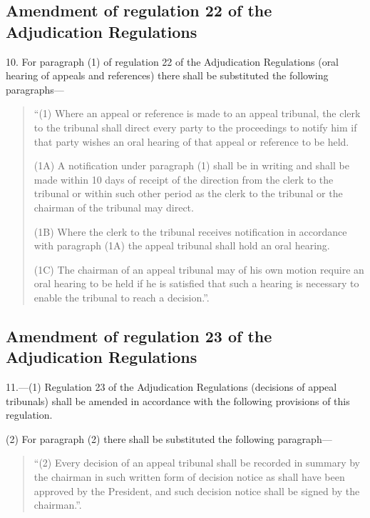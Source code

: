 \documentclass[a4paper]{article}
\begin{document}
\subsection[10. Amendment of regulation 22 of the Adjudication Regulations]{Amendment of regulation 22 of the Adjudication Regulations}

10.  For paragraph (1) of regulation 22 of the Adjudication Regulations (oral hearing of appeals and references) there shall be substituted the following paragraphs—
\begin{quotation}
“(1) Where an appeal or reference is made to an appeal tribunal, the clerk to the tribunal shall direct every party to the proceedings to notify him if that party wishes an oral hearing of that appeal or reference to be held.

(1A) A notification under paragraph (1) shall be in writing and shall be made within 10 days of receipt of the direction from the clerk to the tribunal or within such other period as the clerk to the tribunal or the chairman of the tribunal may direct.

(1B) Where the clerk to the tribunal receives notification in accordance with paragraph (1A) the appeal tribunal shall hold an oral hearing.

(1C) The chairman of an appeal tribunal may of his own motion require an oral hearing to be held if he is satisfied that such a hearing is necessary to enable the tribunal to reach a decision.”.
\end{quotation}

\subsection[11. Amendment of regulation 23 of the Adjudication Regulations]{Amendment of regulation 23 of the Adjudication Regulations}

11.—(1) Regulation 23 of the Adjudication Regulations (decisions of appeal tribunals) shall be amended in accordance with the following provisions of this regulation.

(2) For paragraph (2) there shall be substituted the following paragraph—
\begin{quotation}
“(2) Every decision of an appeal tribunal shall be recorded in summary by the chairman in such written form of decision notice as shall have been approved by the President, and such decision notice shall be signed by the chairman.”.
\end{quotation}
\end{document}
